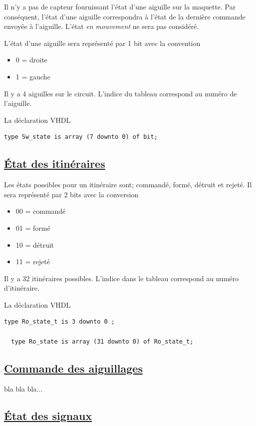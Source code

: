 Il n'y a pas de capteur fournissant l'état d'une aiguille sur la maquette. 
Par conséquent, l'état d'une aiguille correspondra à l'état de la dernière commande envoyée
 à l'aiguille. L'état \emph{en mouvement} ne sera pas considéré.
 
L'état d'une aiguille sera représenté par 1 bit avec la convention 
\begin{itemize}
\item 0 = droite
\item 1 = gauche
\end{itemize}
 
Il y a 4 aiguilles sur le circuit. L'indice du tableau correspond au numéro de l'aiguille.

\medskip
La déclaration VHDL
\begin{lstlisting}[style=vhdl]
  type Sw_state is array (7 downto 0) of bit;  
\end{lstlisting}


\subsection{\underline{\'Etat des itinéraires}}
\label{sec:st_iti}

Les états possibles pour un itinéraire sont; commandé, formé, détruit et rejeté. Il sera représenté
par 2 bits avec la conversion
\begin{itemize} 
\item 00 = commandé
\item 01 = formé
\item 10 = détruit
\item 11 = rejeté
\end{itemize}

Il y a 32 itinéraires possibles. L'indice dans le tableau correspond au numéro d'itinéraire.

\medskip
La déclaration VHDL
\begin{lstlisting}[style=vhdl]
  type Ro_state_t is 3 downto 0 ;

  type Ro_state is array (31 downto 0) of Ro_state_t;  
\end{lstlisting}


\subsection{\underline{Commande des aiguillages}}
\label{sec:cmd_aig}

bla bla bla...

\subsection{\underline{\'Etat des signaux}}
\label{sec:st_sig}

